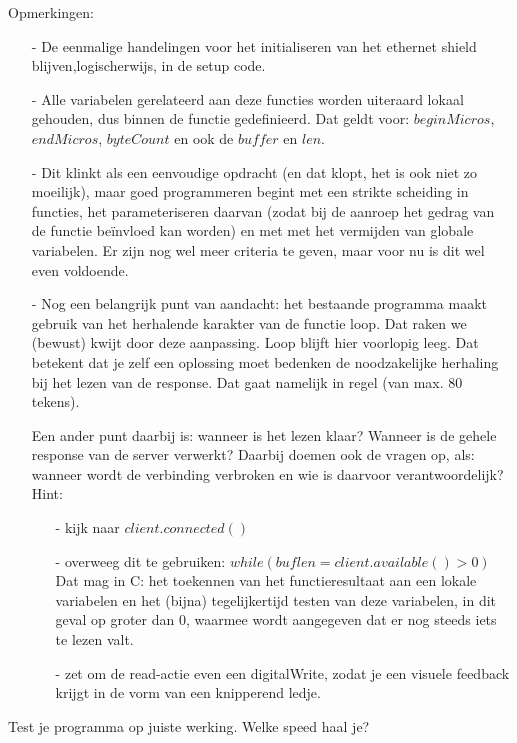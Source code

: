 Opmerkingen:
\begin{enumerate}
  \item[-] De eenmalige handelingen voor het initialiseren van het ethernet shield blijven,logischerwijs, in de setup code.
  \item[-] Alle variabelen gerelateerd aan deze functies worden uiteraard lokaal gehouden, dus binnen de functie gedefinieerd. Dat geldt voor: $beginMicros$, $endMicros$, $byteCount$ en ook de $buffer$ en $len$.
  \item[-] Dit klinkt als een eenvoudige opdracht (en dat klopt, het is ook niet zo moeilijk), maar goed programmeren begint met een strikte scheiding in functies, het parameteriseren daarvan (zodat bij de aanroep het gedrag van de functie beïnvloed kan worden) en met met het vermijden van globale variabelen. Er zijn nog wel meer criteria te geven, maar voor nu is dit wel even voldoende.
  \item[-] Nog een belangrijk punt van aandacht: het bestaande programma maakt gebruik van het herhalende karakter van de functie loop. Dat raken we (bewust) kwijt door deze aanpassing. Loop blijft hier voorlopig leeg. Dat betekent dat je zelf een oplossing moet bedenken de noodzakelijke herhaling bij het lezen van de response. Dat gaat namelijk in regel (van max. 80 tekens). 
  
Een ander punt daarbij is: wanneer is het lezen klaar? Wanneer is de gehele response van de server verwerkt? Daarbij doemen ook de vragen op, als: wanneer wordt de verbinding verbroken en wie is daarvoor verantwoordelijk? Hint:
  \begin{enumerate}
    \item[-] kijk naar $client.connected()$
    \item[-] overweeg dit te gebruiken: $while (buflen = client.available() > 0)$ Dat mag in C: het toekennen van het functieresultaat aan een lokale variabelen en het (bijna) tegelijkertijd testen van deze variabelen, in dit geval op groter dan 0, waarmee wordt aangegeven dat er nog steeds iets te lezen valt.
    \item[-] zet om de read-actie even een digitalWrite, zodat je een visuele feedback krijgt in de vorm van een knipperend ledje.
  \end{enumerate}
\end{enumerate}
\begin{exercise}
Test je programma op juiste werking. Welke speed haal je?
\end{exercise}


